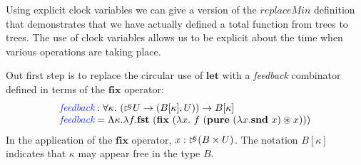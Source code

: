 \documentclass[natbib]{sigplanconf}
\newcommand{\kw}[1]{\textbf{#1}}
\newcommand{\ident}[1]{\textit{#1}}
\newcommand{\defn}[1]{\textcolor{defnd}{\ident{#1}}}
\newcommand{\delay}[1]{\mathord{\rhd\kern-0.4em^{#1}}}
\begin{document}
Using explicit clock variables we can give a version of the
$\ident{replaceMin}$ definition that demonstrates that we have
actually defined a total function from trees to trees. The use of
clock variables allows us to be explicit about the time when various
operations are taking place.

Out first step is to replace the circular use of $\kw{let}$ with a
\emph{feedback} combinator defined in terms of the $\kw{fix}$
operator:
\begin{displaymath}
  \begin{array}{l}
    \defn{feedback} : \forall \kappa.~(\delay\kappa U \to (B[\kappa], U)) \to B[\kappa] \\
    \defn{feedback} = \Lambda \kappa. \lambda f. \kw{fst}~(\kw{fix}~(\lambda x.~f~(\kw{pure}~(\lambda x. \kw{snd}~x) \circledast x)))
  \end{array}
\end{displaymath}
In the application of the $\kw{fix}$ operator, $x : \delay\kappa (B
\times U)$.  The notation $B[\kappa]$ indicates that $\kappa$ may
appear free in the type $B$.


\newcommand{\hlchangem}[1]{\colorbox{greybg}{$#1$}}
\newcommand{\hlchange}[1]{\colorbox{greybg}{#1}}
\end{document}
